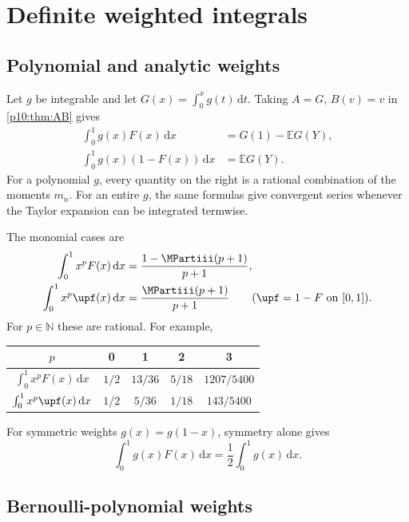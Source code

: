 \documentclass[11pt,oneside]{article}
\theoremstyle{definition}
\theoremstyle{remark}
\newcommand{\F}{F}
\newcommand{\E}{\mathbb E}
\newcommand{\N}{\mathbb N}
\newcommand{\dd}{\,\mathrm d}
\newcommand{\1}{\mathbf 1}
\begin{document}
\section{Definite weighted integrals}

\subsection{Polynomial and analytic weights}

Let \(g\) be integrable and let \(G(x)=\int_0^xg(t)\dd t\).  Taking \(A=G\),
\(B(v)=v\) in \cref{p10:thm:AB} gives
\begin{align}
 \int_0^1g(x)\F(x)\dd x&=G(1)-\E G(Y),
 \label{p10:eq:analytic-kernel-F}\\
 \int_0^1g(x)(1-\F(x))\dd x&=\E G(Y).
 \label{p10:eq:analytic-kernel-up}
\end{align}
For a polynomial \(g\), every quantity on the right is a rational combination of the
moments \(m_n\).  For an entire \(g\), the same formulas give convergent series whenever
the Taylor expansion can be integrated termwise.

The monomial cases are
\begin{align}
 \int_0^1x^p\F(x)\dd x&=\frac{1-\MPartiii(p+1)}{p+1},
 \label{p10:eq:monomial-F-definite}\\
 \int_0^1x^p\upf(x)\dd x&=\frac{\MPartiii(p+1)}{p+1}
 \qquad(\upf=1-\F\text{ on }[0,1]).
 \label{p10:eq:monomial-up-definite}
\end{align}
For \(p\in\N\) these are rational.  For example,
\begin{center}
\begin{tabular}{@{}c|cccc@{}}
\toprule
\(p\)&0&1&2&3\\
\midrule
\(\int_0^1x^p\F(x)\dd x\)&\(1/2\)&\(13/36\)&\(5/18\)&\(1207/5400\)\\
\(\int_0^1x^p\upf(x)\dd x\)&\(1/2\)&\(5/36\)&\(1/18\)&\(143/5400\)\\
\bottomrule
\end{tabular}
\end{center}

For symmetric weights \(g(x)=g(1-x)\), symmetry alone gives
\begin{equation}\label{p10:eq:symmetric-weight}
 \int_0^1g(x)\F(x)\dd x=\frac12\int_0^1g(x)\dd x.
\end{equation}

\subsection{Bernoulli-polynomial weights}
\end{document}
